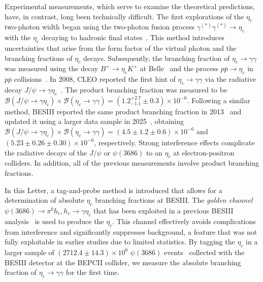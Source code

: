 \documentclass[twocolumn,showpacs,aps,prl]{revtex4-2}
\begin{document}
Experimental measurements, which serve to examine the theoretical predictions, have, in contrast, long been technically difficult. The first explorations of the $\eta_c$ two-photon width began using the two-photon fusion process $\gamma^{(*)} \gamma^{(*)} \to \eta_c$ with the $\eta_c$ decaying to hadronic final states~\cite{ParticleDataGroup:2024cfk}.  This method introduces uncertainties that arise from the form factor of the virtual photon and the branching fractions of $\eta_c$ decays. Subsequently, the branching fraction of $\eta_c \to \gamma \gamma$ was measured using the decay $B^+ \to \eta_c K^+$ at Belle~\cite{Belle:2006mzv} and the process $p \bar{p} \to \eta_c$ in $p \bar{p}$ collisions~\cite{AnnecyLAPP-CERN-Genoa-Lyon-Oslo-Rome-Strasbourg-Turin:1987qkd, E760:1995rep, FermilabE835:2003ula}. In 2008, CLEO reported the first hint of $\eta_c \to \gamma \gamma$ via the radiative decay $J/\psi \to \gamma \eta_c$~\cite{CLEO:2008qfy, BESIII:2012lxx, BESIII:2024rex}. The product branching fraction was measured to be $\mathcal{B}(J/\psi \to \gamma \eta_c) \times \mathcal{B}(\eta_c \to \gamma \gamma) = (1.2^{+2.7}_{-1.1} \pm 0.3) \times 10^{-6}$. Following a similar method, BESIII reported the same product branching fraction in 2013~\cite{BESIII:2012lxx} and updated it using a larger data sample in 2025~\cite{BESIII:2024rex}, obtaining $\mathcal{B}(J/\psi \to \gamma \eta_c) \times \mathcal{B}(\eta_c \to \gamma \gamma) = (4.5 \pm 1.2 \pm 0.6) \times 10^{-6}$ and $(5.23 \pm 0.26 \pm 0.30) \times 10^{-6}$, respectively. Strong interference effects complicate the radiative decays of the $J/\psi$ or $\psi(3686)$ to an $\eta_c$ at electron-positron colliders. In addition, all of the previous measurements involve product branching fractions.

In this Letter, a tag-and-probe method is introduced that allows for a determination of absolute $\eta_c$ branching fractions at BESIII. The \textit{golden channel} $\psi(3686)\to \pi^0 h_c,h_c\to\gamma\eta_c$ that has been exploited in a previous BESIII analysis~\cite{BESIII:2012urf} is used to produce the $\eta_c$. This channel effectively avoids complications from interference and significantly suppresses background, a feature that was not fully exploitable in earlier studies due to limited statistics. By tagging the $\eta_c$ in a larger sample of $(2712.4\pm 14.3) \times 10^6$ $\psi(3686)$ events~\cite{BESIII:2017tvm, BESIII:2024lks} collected with the BESIII detector at the BEPCII collider, we measure the absolute branching fraction of $\eta_c \to \gamma \gamma$ for the first time.
\end{document}
